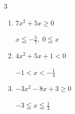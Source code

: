 \begin{multicols}{3}
\begin{enumerate}
        $\displaystyle x \leqq \frac{2}{3} , \; \frac{3}{2} \leqq x$

  \item $7x^{2}+5x\geq 0$

        $\displaystyle x \leqq -\frac{5}{7} , \; 0 \leqq x$

  \item $4x^{2}+5x+1<0$

        $\displaystyle -1 < x < -\frac{1}{4}$

  \item $-3x^{2}-8x+3\geq 0$

        $\displaystyle -3 \leqq x \leqq \frac{1}{3}$

\end{enumerate}
\end{multicols}

